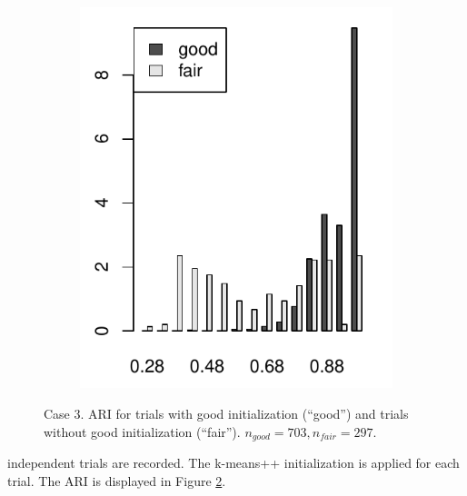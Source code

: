 \begin{figure}
\begin{subfigure}{.45\textwidth}
\includegraphics[width=\linewidth]{../simulation/plots/ARI_hist_case3}
\caption{}
\label{fig: ARI hist, case 3}
\end{subfigure}
\caption{Case 3. ARI for trials with good initialization (``good'') and trials without good initialization (``fair''). $n_{good}=703, n_{fair}=297.$
}
\label{fig: ARI, case3}
\end{figure}

 independent trials are recorded. 
The k-means++ initialization is applied for each trial.
The ARI is displayed in Figure \ref{fig: ARI, case3}.


